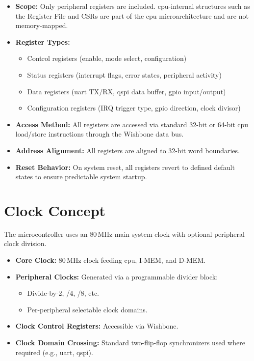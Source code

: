 \begin{itemize}
      \item \textbf{Scope:}
            Only peripheral registers are included.
            \gls{cpu}-internal structures such as the Register File and CSRs are part of the \gls{cpu} microarchitecture
            and are not memory-mapped.

      \item \textbf{Register Types:}
            \begin{itemize}
                  \item Control registers (enable, mode select, configuration)
                  \item Status registers (interrupt flags, error states, peripheral activity)
                  \item Data registers (\gls{uart} TX/RX, \gls{qspi} data buffer, \gls{gpio}
                        input/output)
                  \item Configuration registers (\gls{IRQ} trigger type, \gls{gpio} direction, clock
                        divisor)
            \end{itemize}

      \item \textbf{Access Method:}
            All registers are accessed via standard 32-bit or 64-bit \gls{cpu} load/store instructions through the
            Wishbone data bus.

      \item \textbf{Address Alignment:}
            All registers are aligned to 32-bit word boundaries.

      \item \textbf{Reset Behavior:}
            On system reset, all registers revert to defined default states to ensure predictable system startup.

\end{itemize}

\section{Clock Concept}
The microcontroller uses an 80\,MHz main system clock with optional peripheral
clock division.

\begin{itemize}
      \item \textbf{Core Clock:} 80\,MHz clock feeding \gls{cpu}, \gls{I-MEM}, and \gls{D-MEM}.
      \item \textbf{Peripheral Clocks:} Generated via a programmable divider block:
            \begin{itemize}
                  \item Divide-by-2, /4, /8, etc.
                  \item Per-peripheral selectable clock domains.
            \end{itemize}
      \item \textbf{Clock Control Registers:} Accessible via Wishbone.
      \item \textbf{Clock Domain Crossing:}
            Standard two-flip-flop synchronizers used where required (e.g., \gls{uart}, \gls{qspi}).
\end{itemize}

